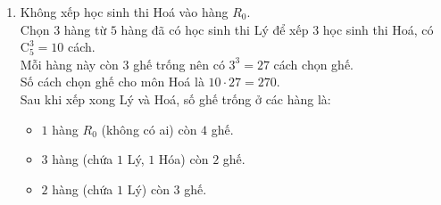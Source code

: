 \begin{ex}
{\begin{enumerate}[\it TH 1:]
			Chọn $2$ hàng từ $5$ hàng đã có học sinh thi Lý để xếp $2$ học sinh thi Hoá, có $\mathrm{C}_5^2 = 10$ cách.\\
			Mỗi hàng này còn $3$ ghế trống nên có $3^2 = 9$ cách chọn ghế.\\
			Số cách chọn ghế cho môn Hoá là $4 \cdot 10 \cdot 9 = 360$.\\
			Sau khi xếp xong Lý và Hoá, số ghế trống ở các hàng là:
			\begin{itemize}
				\item $1$ hàng $R_0$ (chứa $1$ Hóa) còn $3$ ghế.
				\item $2$ hàng (chứa $1$ Lý, $1$ Hóa) còn $2$ ghế.
				\item $3$ hàng (chứa $1$ Lý) còn $3$ ghế.
			\end{itemize}
			Vậy có $4$ hàng còn $3$ ghế trống và $2$ hàng còn $2$ ghế trống.\\
			Chọn $2$ hàng từ $6$ hàng trên để xếp $2$ học sinh thi Sử (mỗi hàng chọn $1$ ghế)
			\begin{itemize}
				\item Chọn $2$ hàng từ nhóm $4$ hàng ($3$ ghế): $\mathrm{C}_4^2 \cdot 3 \cdot 3 = 54$ cách.
				\item Chọn $1$ hàng từ nhóm $4$ hàng ($3$ ghế) và $1$ hàng từ nhóm $2$ hàng ($2$ ghế): $\mathrm{C}_4^1 \cdot \mathrm{C}_2^1 \cdot 3 \cdot 2 = 48$ cách.
				\item Chọn $2$ hàng từ nhóm $2$ hàng ($2$ ghế): $\mathrm{C}_2^2 \cdot 2 \cdot 2 = 4$ cách.
			\end{itemize}
			Số cách chọn ghế cho môn Sử là $54 + 48 + 4 = 106$.\\
			Do đó, số cách chọn ghế trong trường hợp này là $360 \cdot 106 = 38\,160$.
			\item Không xếp học sinh thi Hoá vào hàng $R_0$.\\
			Chọn $3$ hàng từ $5$ hàng đã có học sinh thi Lý để xếp $3$ học sinh thi Hoá, có $\mathrm{C}_5^3 = 10$ cách.\\
			Mỗi hàng này còn $3$ ghế trống nên có $3^3 = 27$ cách chọn ghế.\\
			Số cách chọn ghế cho môn Hoá là $10 \cdot 27 = 270$.\\
			Sau khi xếp xong Lý và Hoá, số ghế trống ở các hàng là:
			\begin{itemize}
				\item $1$ hàng $R_0$ (không có ai) còn $4$ ghế.
				\item $3$ hàng (chứa $1$ Lý, $1$ Hóa) còn $2$ ghế.
				\item $2$ hàng (chứa $1$ Lý) còn $3$ ghế.

\end{itemize}
\end{enumerate}}
\end{ex}
